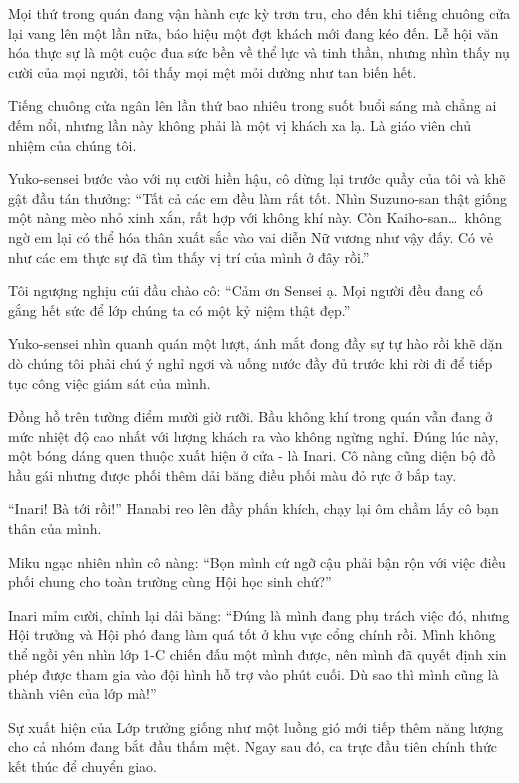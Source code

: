 \documentclass[../main.tex]{subfiles}
\begin{document}
Mọi thứ trong quán đang vận hành cực kỳ trơn tru, cho đến khi tiếng chuông cửa lại vang lên một lần nữa, báo hiệu một đợt khách mới đang kéo đến. Lễ hội văn hóa thực sự là một cuộc đua sức bền về thể lực và tinh thần, nhưng nhìn thấy nụ cười của mọi người, tôi thấy mọi mệt mỏi dường như tan biến hết.

\ct

Tiếng chuông cửa ngân lên lần thứ bao nhiêu trong suốt buổi sáng mà chẳng ai đếm nổi, nhưng lần này không phải là một vị khách xa lạ. Là giáo viên chủ nhiệm của chúng tôi.

Yuko-sensei bước vào với nụ cười hiền hậu, cô dừng lại trước quầy của tôi và khẽ gật đầu tán thưởng: ``Tất cả các em đều làm rất tốt. Nhìn Suzuno-san thật giống một nàng mèo nhỏ xinh xắn, rất hợp với không khí này. Còn Kaiho-san\dots\ không ngờ em lại có thể hóa thân xuất sắc vào vai diễn Nữ vương như vậy đấy. Có vẻ như các em thực sự đã tìm thấy vị trí của mình ở đây rồi.''

Tôi ngượng nghịu cúi đầu chào cô: ``Cảm ơn Sensei ạ. Mọi người đều đang cố gắng hết sức để lớp chúng ta có một kỷ niệm thật đẹp.''

Yuko-sensei nhìn quanh quán một lượt, ánh mắt đong đầy sự tự hào rồi khẽ dặn dò chúng tôi phải chú ý nghỉ ngơi và uống nước đầy đủ trước khi rời đi để tiếp tục công việc giám sát của mình.

Đồng hồ trên tường điểm mười giờ rưỡi. Bầu không khí trong quán vẫn đang ở mức nhiệt độ cao nhất với lượng khách ra vào không ngừng nghỉ. Đúng lúc này, một bóng dáng quen thuộc xuất hiện ở cửa - là Inari. Cô nàng cũng diện bộ đồ hầu gái nhưng được phối thêm dải băng điều phối màu đỏ rực ở bắp tay.

``Inari! Bà tới rồi!'' Hanabi reo lên đầy phấn khích, chạy lại ôm chầm lấy cô bạn thân của mình.

Miku ngạc nhiên nhìn cô nàng: ``Bọn mình cứ ngỡ cậu phải bận rộn với việc điều phối chung cho toàn trường cùng Hội học sinh chứ?''

Inari mỉm cười, chỉnh lại dải băng: ``Đúng là mình đang phụ trách việc đó, nhưng Hội trưởng và Hội phó đang làm quá tốt ở khu vực cổng chính rồi. Mình không thể ngồi yên nhìn lớp 1-C chiến đấu một mình được, nên mình đã quyết định xin phép được tham gia vào đội hình hỗ trợ vào phút cuối. Dù sao thì mình cũng là thành viên của lớp mà!''

Sự xuất hiện của Lớp trưởng giống như một luồng gió mới tiếp thêm năng lượng cho cả nhóm đang bắt đầu thấm mệt. Ngay sau đó, ca trực đầu tiên chính thức kết thúc để chuyển giao.
\end{document}
